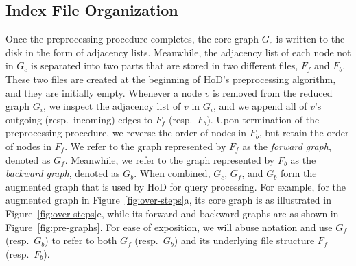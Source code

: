 \documentclass{sig-alternate}
\def\GC{G_c}
\def\GF{G_f}
\def\GB{G_b}
\def\FF{F_f}
\def\FB{F_b}
\begin{document}
\begin{sloppy}
\subsection{Index File Organization} \label{sec:pre-file}


Once the preprocessing procedure completes, the core graph $\GC$ is written to the disk in the form of adjacency lists. Meanwhile, the adjacency list of each node not in $\GC$ is separated into two parts that are stored in two different files, $\FF$ and $\FB$. These two files are created at the beginning of HoD's preprocessing algorithm, and they are initially empty. Whenever a node $v$ is removed from the reduced graph $G_i$, we inspect the adjacency list of $v$ in $G_i$, and we append all of $v$'s outgoing (resp.\ incoming) edges to $\FF$ (resp.\ $\FB$). Upon termination of the preprocessing procedure, we reverse the order of nodes in $\FB$, but retain the order of nodes in $\FF$. We refer to the graph represented by $\FF$ as the {\em forward graph}, denoted as $\GF$. Meanwhile, we refer to the graph represented by $\FB$ as the {\em backward graph}, denoted as $\GB$. When combined, $\GC$, $\GF$, and $\GB$ form the augmented graph that is used by HoD for query processing. For example, for the augmented graph in Figure~\ref{fig:over-steps}a, its core graph is as illustrated in Figure~\ref{fig:over-steps}e, while its forward and backward graphs are as shown in Figure~\ref{fig:pre-graphs}. For ease of exposition, we will abuse notation and use $\GF$ (resp.\ $\GB$) to refer to both $\GF$ (resp.\ $\GB$) and its underlying file structure $\FF$ (resp.\ $\FB$).







\end{sloppy}
\end{document}
